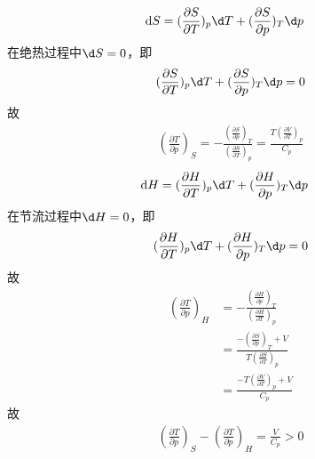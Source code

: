 \documentclass{phyasgn}
\begin{document}
\begin{sol}[5]
    \begin{align*}
        \mathrm{d}S&=(\frac{\partial S}{\partial T})_p\d T+(\frac{\partial S}{\partial p})_T\d p
    \end{align*}
    在绝热过程中$\d S=0$，即
    \begin{align*}
        (\frac{\partial S}{\partial T})_p\d T+(\frac{\partial S}{\partial p})_T\d p=0
    \end{align*}
    故
    \begin{align*}
        (\frac{\partial T}{\partial p})_S=-\frac{(\frac{\partial S}{\partial p})_T}{(\frac{\partial S}{\partial T})_p}=\frac{T(\frac{\partial V}{\partial T})_p}{C_p}
    \end{align*}
    \begin{align*}
        \mathrm{d}H&=(\frac{\partial H}{\partial T})_p\d T+(\frac{\partial H}{\partial p})_T\d p
    \end{align*}
    在节流过程中$\d H=0$，即
    \begin{align*}
        (\frac{\partial H}{\partial T})_p\d T+(\frac{\partial H}{\partial p})_T\d p=0
    \end{align*}
    故
    \begin{align*}
        (\frac{\partial T}{\partial p})_H&=-\frac{(\frac{\partial H}{\partial p})_T}{(\frac{\partial H}{\partial T})_p}\\
        &=\frac{-(\frac{\partial S}{\partial p})_T+V}{T(\frac{\partial S}{\partial T})_p}\\
        &=\frac{-T(\frac{\partial V}{\partial T})_p+V}{C_p}
    \end{align*}
    故
    \begin{align*}
        (\frac{\partial T}{\partial p})_S-(\frac{\partial T}{\partial p})_H=\frac{V}{C_p}>0
    \end{align*}
\end{sol}\par
\end{document}
